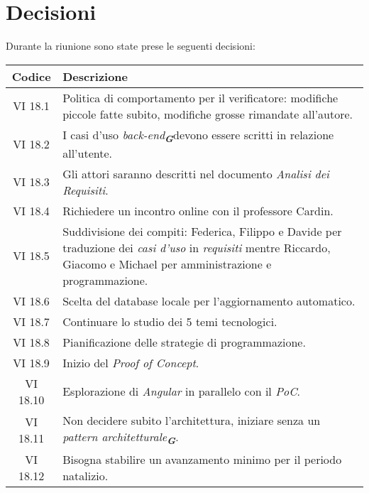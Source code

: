 
\section{Decisioni}

Durante la riunione sono state prese le seguenti decisioni:

\vspace{0.5cm}

\begin{table}[htbp]
    \centering
    \begin{tabular}{|c|p{}|}
        \hline
        \rowcolor[gray]{0.75}
        \textbf{Codice} & \textbf{Descrizione}\\
        \hline
        VI 18.1 & Politica di comportamento per il verificatore: modifiche piccole fatte subito, modifiche grosse rimandate all'autore.\\
        \hline
        VI 18.2 & I casi d'uso \emph{back-end}\textsubscript{\textit{\textbf{G}}}devono essere scritti in relazione all'utente.\\
        \hline
        VI 18.3 & Gli attori saranno descritti nel documento \emph{Analisi dei Requisiti}.\\
        \hline
        VI 18.4 & Richiedere un incontro online con il professore Cardin. \\
        \hline
        VI 18.5 & Suddivisione dei compiti: Federica, Filippo e Davide per traduzione dei \emph{casi d'uso} in \emph{requisiti} mentre Riccardo, Giacomo e Michael per amministrazione e programmazione.\\
        \hline
        VI 18.6 & Scelta del database locale per l'aggiornamento automatico. \\
        \hline
        VI 18.7 & Continuare lo studio dei 5 temi tecnologici.\\
        \hline
        VI 18.8 & Pianificazione delle strategie di programmazione.\\
        \hline
        VI 18.9 & Inizio del \emph{Proof of Concept}.\\
        \hline
        VI 18.10 & Esplorazione di \emph{Angular} in parallelo con il \emph{PoC}.\\
        \hline
        VI 18.11 & Non decidere subito l'architettura, iniziare senza un \emph{pattern architetturale}\textsubscript{\textit{\textbf{G}}}.\\
        \hline
        VI 18.12 & Bisogna stabilire un avanzamento minimo per il periodo natalizio.\\
        \hline
    \end{tabular}
\end{table}